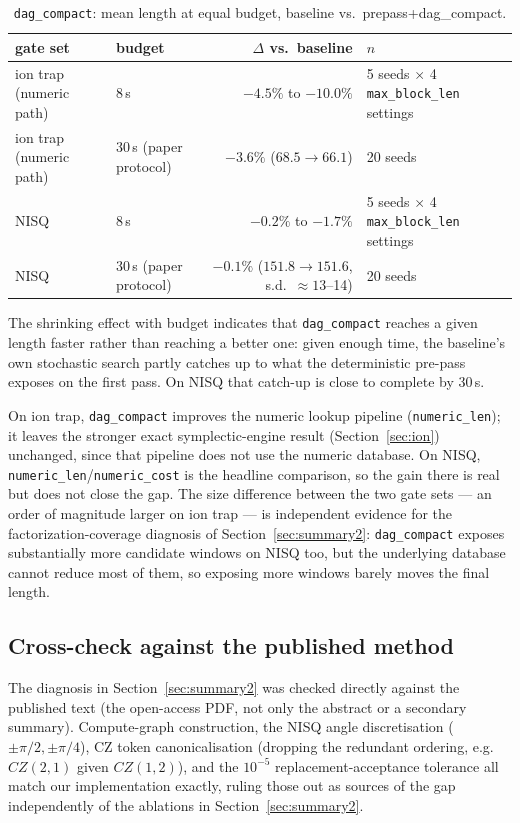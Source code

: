 \documentclass[11pt,a4paper]{article}
\begin{document}
\begin{table}[H]
\centering
\caption{\texttt{dag\_compact}: mean length at equal budget, baseline vs.\
prepass+dag\_compact.}
\label{tab:dag}
\begin{tabular}{llrl}
\toprule
gate set & budget & $\Delta$ vs.\ baseline & $n$ \\
\midrule
ion trap (numeric path) & 8\,s  & $-4.5\%$ to $-10.0\%$ & 5 seeds $\times$ 4 \texttt{max\_block\_len} settings \\
ion trap (numeric path) & 30\,s (paper protocol) & $-3.6\%$ ($68.5\to66.1$) & 20 seeds \\
NISQ & 8\,s  & $-0.2\%$ to $-1.7\%$ & 5 seeds $\times$ 4 \texttt{max\_block\_len} settings \\
NISQ & 30\,s (paper protocol) & $-0.1\%$ ($151.8\to151.6$, s.d.\ $\approx13$--14) & 20 seeds \\
\bottomrule
\end{tabular}
\end{table}

The shrinking effect with budget indicates that \texttt{dag\_compact}
reaches a given length faster rather than reaching a better one: given
enough time, the baseline's own stochastic search partly catches up to what
the deterministic pre-pass exposes on the first pass. On NISQ that
catch-up is close to complete by 30\,s.

On ion trap, \texttt{dag\_compact} improves the numeric lookup pipeline
(\texttt{numeric\_len}); it leaves the stronger exact symplectic-engine
result (Section~\ref{sec:ion}) unchanged, since that pipeline does not use
the numeric database. On NISQ, \texttt{numeric\_len}/\texttt{numeric\_cost}
is the headline comparison, so the gain there is real but does not close
the gap. The size difference between the two gate sets --- an order of
magnitude larger on ion trap --- is independent evidence for the
factorization-coverage diagnosis of Section~\ref{sec:summary2}:
\texttt{dag\_compact} exposes substantially more candidate windows on NISQ
too, but the underlying database cannot reduce most of them, so exposing
more windows barely moves the final length.

\subsection{Cross-check against the published method}
\label{sec:crosscheck}
The diagnosis in Section~\ref{sec:summary2} was checked directly against the
published text (the open-access PDF, not only the abstract or a secondary
summary). Compute-graph construction, the NISQ angle discretisation
($\pm\pi/2,\pm\pi/4$), CZ token canonicalisation (dropping the redundant
ordering, e.g.\ $CZ(2,1)$ given $CZ(1,2)$), and the $10^{-5}$
replacement-acceptance tolerance all match our implementation exactly,
ruling those out as sources of the gap independently of the ablations in
Section~\ref{sec:summary2}.
\end{document}
